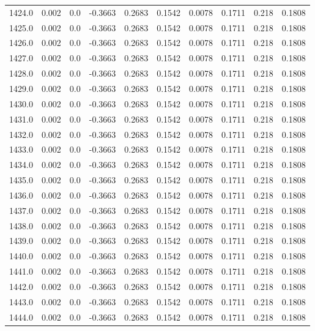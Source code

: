 \begin{longtable}{lrrrrrrrrr}
1424.0 & 0.002 & 0.0 & -0.3663 & 0.2683 & 0.1542 & 0.0078 & 0.1711 & 0.218 & 0.1808 \\
1425.0 & 0.002 & 0.0 & -0.3663 & 0.2683 & 0.1542 & 0.0078 & 0.1711 & 0.218 & 0.1808 \\
1426.0 & 0.002 & 0.0 & -0.3663 & 0.2683 & 0.1542 & 0.0078 & 0.1711 & 0.218 & 0.1808 \\
1427.0 & 0.002 & 0.0 & -0.3663 & 0.2683 & 0.1542 & 0.0078 & 0.1711 & 0.218 & 0.1808 \\
1428.0 & 0.002 & 0.0 & -0.3663 & 0.2683 & 0.1542 & 0.0078 & 0.1711 & 0.218 & 0.1808 \\
1429.0 & 0.002 & 0.0 & -0.3663 & 0.2683 & 0.1542 & 0.0078 & 0.1711 & 0.218 & 0.1808 \\
1430.0 & 0.002 & 0.0 & -0.3663 & 0.2683 & 0.1542 & 0.0078 & 0.1711 & 0.218 & 0.1808 \\
1431.0 & 0.002 & 0.0 & -0.3663 & 0.2683 & 0.1542 & 0.0078 & 0.1711 & 0.218 & 0.1808 \\
1432.0 & 0.002 & 0.0 & -0.3663 & 0.2683 & 0.1542 & 0.0078 & 0.1711 & 0.218 & 0.1808 \\
1433.0 & 0.002 & 0.0 & -0.3663 & 0.2683 & 0.1542 & 0.0078 & 0.1711 & 0.218 & 0.1808 \\
1434.0 & 0.002 & 0.0 & -0.3663 & 0.2683 & 0.1542 & 0.0078 & 0.1711 & 0.218 & 0.1808 \\
1435.0 & 0.002 & 0.0 & -0.3663 & 0.2683 & 0.1542 & 0.0078 & 0.1711 & 0.218 & 0.1808 \\
1436.0 & 0.002 & 0.0 & -0.3663 & 0.2683 & 0.1542 & 0.0078 & 0.1711 & 0.218 & 0.1808 \\
1437.0 & 0.002 & 0.0 & -0.3663 & 0.2683 & 0.1542 & 0.0078 & 0.1711 & 0.218 & 0.1808 \\
1438.0 & 0.002 & 0.0 & -0.3663 & 0.2683 & 0.1542 & 0.0078 & 0.1711 & 0.218 & 0.1808 \\
1439.0 & 0.002 & 0.0 & -0.3663 & 0.2683 & 0.1542 & 0.0078 & 0.1711 & 0.218 & 0.1808 \\
1440.0 & 0.002 & 0.0 & -0.3663 & 0.2683 & 0.1542 & 0.0078 & 0.1711 & 0.218 & 0.1808 \\
1441.0 & 0.002 & 0.0 & -0.3663 & 0.2683 & 0.1542 & 0.0078 & 0.1711 & 0.218 & 0.1808 \\
1442.0 & 0.002 & 0.0 & -0.3663 & 0.2683 & 0.1542 & 0.0078 & 0.1711 & 0.218 & 0.1808 \\
1443.0 & 0.002 & 0.0 & -0.3663 & 0.2683 & 0.1542 & 0.0078 & 0.1711 & 0.218 & 0.1808 \\
1444.0 & 0.002 & 0.0 & -0.3663 & 0.2683 & 0.1542 & 0.0078 & 0.1711 & 0.218 & 0.1808 \\

\end{longtable}
